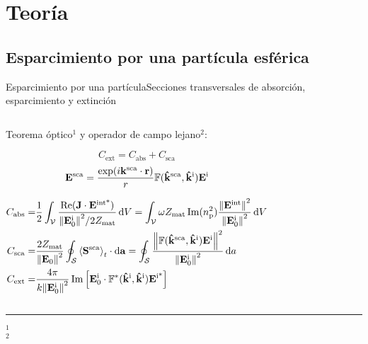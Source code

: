 
\section{Teoría}
\subsection{Esparcimiento por una partícula esférica}

\begin{frame}{Esparcimiento por una partícula}{Secciones transversales de absorción, esparcimiento y extinción}
    \begin{columns}
	\centering \small
	
	\centering
\begin{alertblock}{Teorema óptico$^1$ y operador de campo lejano$^2$:}	
	
	
 $$ C_\text{ext}  = C_\text{abs} + C_\text{sca} $$
  $$ \vb{E}^\text{sca} =   \frac{\exp(i\vb{k}^\text{sca}\cdot\vb{r})}{r} \mathbb{F}(\vu{k}^\text{sca}, \vu{k}^\text{i}) \vb{E}^\text{i} $$

 \begin{align*}
 C_\text{abs} =&  \frac12\int_\mathcal{V} \frac{\Re(\vb{J}\cdot \vb{E}^\text{int*})}
 									{\norm{\vb{E}_0^\text{i}}^2/2Z_\text{mat}}\dd{V}
 			= \int_\mathcal{V} \omega Z_\text{mat}\Im(n_\text{p}^2) \frac{\norm{\vb{E}^\text{int}}^2}{\norm{\vb{E}^\text{i}_0}^2} \dd{V}\\
 	C_\text{sca} =& \frac{2Z_\text{mat}}{\norm{\vb{E}_0}^2} \oint_\mathcal{S} \ev{\vb{S}^\text{sca}}_t \cdot\dd{\vb{a}}
 	 =  \oint_\mathcal{S} \frac{\norm{\mathbb{F}(\vu{k}^\text{sca},\vu{k}^\text{i})\vb{E}^\text{i}}^2}
									{\norm{\vb{E}^\text{i}_0}^2}\dd{a}\\
C_\text{ext} =&  \frac{4\pi}{k \norm{\vb{E}_0^\text{i}}^2}\Im\qty[ \vb{E}_0^\text{i}\cdot \mathbb{F}^*(\vu{k}^\text{i},\vu{k}^\text{i}) \vb{E}^\text{i*} ]
 \end{align*}
 \end{alertblock}
\end{columns}

\vspace*{2em}
	\noindent\rule{.25\textwidth}{0.4pt}
 \begin{spacing}{0}\fontsize{4}{12} \selectfont
	$^1$ \\
	$^2$ 
	\end{spacing}

  \end{frame}


